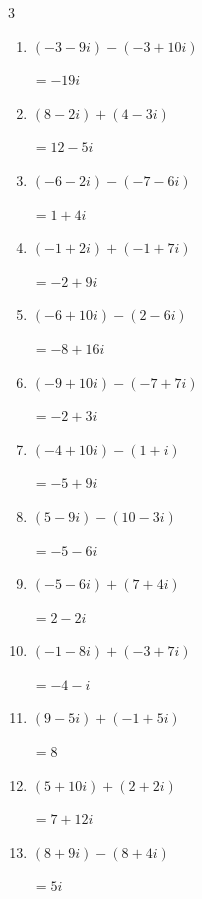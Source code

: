 \begin{multicols}{3}
\begin{enumerate}
  \item $\displaystyle (-3-9i) - (-3+10i)$

        $\displaystyle =-19i$

  \item $\displaystyle (8-2i) + (4-3i)$

        $\displaystyle =12-5i$

  \item $\displaystyle (-6-2i) - (-7-6i)$

        $\displaystyle =1+4i$

  \item $\displaystyle (-1+2i) + (-1+7i)$

        $\displaystyle =-2+9i$

  \item $\displaystyle (-6+10i) - (2-6i)$

        $\displaystyle =-8+16i$

  \item $\displaystyle (-9+10i) - (-7+7i)$

        $\displaystyle =-2+3i$

  \item $\displaystyle (-4+10i) - (1+i)$

        $\displaystyle =-5+9i$

\columnbreak %

\resetques

  \item $\displaystyle (5-9i) - (10-3i)$

        $\displaystyle =-5-6i$

  \item $\displaystyle (-5-6i) + (7+4i)$

        $\displaystyle =2-2i$

  \item $\displaystyle (-1-8i) + (-3+7i)$

        $\displaystyle =-4-i$

  \item $\displaystyle (9-5i) + (-1+5i)$

        $\displaystyle =8$

  \item $\displaystyle (5+10i) + (2+2i)$

        $\displaystyle =7+12i$

  \item $\displaystyle (8+9i) - (8+4i)$

        $\displaystyle =5i$


\end{enumerate}
\end{multicols}
